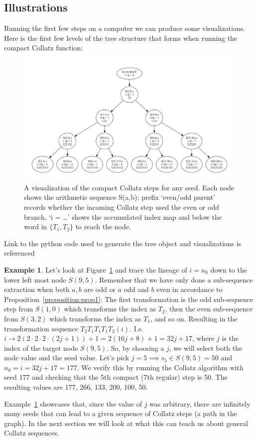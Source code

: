 \documentclass{article}
\theoremstyle{definition}
\newtheorem{example}{Example}[section]
\begin{document}
\subsection*{Illustrations}
Running the first few steps on a computer we can produce some visualizations. Here is the first few levels of the tree structure that forms when running the compact Collatz function:
\begin{figure}[H]
\begin{center} 
\includegraphics[width=1.0\textwidth]{tree_illustration.pdf}
\caption{A visualization of the compact Collatz steps for any seed. Each node shows the arithmetic sequence S(a,b); prefix ‘even/odd parent’ records whether the incoming Collatz step used the even or odd branch. ‘i = …’ shows the accumulated index map and below the word in $\{T_1,T_2\}$ to reach the node.}
\label{fig:fig2}
\end{center}
\end{figure}
%
Link to the python code used to generate the tree object and visualizations is referenced \cite{Angermund2025}
%
\begin{example}\label{example:ex2}
Let's look at Figure~\ref{fig:fig2} and trace the lineage of $i=n_0$ down to the lower left most node $S(9,5)$. Remember that we have only done a sub-sequence extraction when both $a,b$ are odd or $a$ odd and $b$ even in accordance to Proposition~\ref{proposition:prop1}:
The first transformation is the odd sub-sequence step from $S(1,0)$ which transforms the index as $T_2$, then the even sub-sequence from $S(3,2)$ which transforms the index as $T_1$, and so on. Resulting in the transformation sequence $T_2T_1T_1T_1T_2(i)$. I.e. $i \longrightarrow 2(2\cdot2\cdot2\cdot(2j+1))+1 = 2(16j+8)+1 = 32j+17$, where $j$ is the index of the target node $S(9,5)$.
So, by choosing a $j$, we will select both the node value and the seed value. Let's pick $j=5 \implies s_5\in S(9,5) = 50$ and $n_0 = i = 32j+17 = 177$. We verify this by running the Collatz algorithm with seed 177 and checking that the 5th compact (7th regular) step is 50. The resulting values are 177, 266, 133, 200, 100, 50.
\end{example}
%
Example~\ref{example:ex2} showcases that, since the value of $j$ was arbitrary, there are infinitely many seeds that can lead to a given sequence of Collatz steps (a path in the graph). In the next section we will look at what this can teach us about general Collatz sequences.
\end{document}
